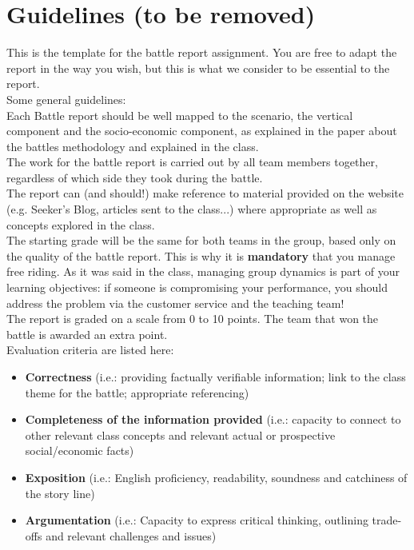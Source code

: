 \section{Guidelines (to be removed)}
This is the template for the battle report assignment. You are free to adapt the report in the way you wish, but this is what we consider to be essential to the report.\\
\vspace{1em}
Some general guidelines: \\
Each Battle report should be well mapped to the scenario, the vertical component  and the socio-economic component, as explained in the paper about the battles methodology and explained in the class.\\
The work for the battle report is carried out by all team members together, regardless of which side they took during the battle.\\
The report can (and should!) make reference to material provided on the website (e.g. Seeker’s Blog, articles sent to the class...) where appropriate as well as concepts explored in the class.\\
The starting grade will be the same for both teams in the group, based only on the quality of the battle report. This is why it is \textbf{mandatory} that you manage free riding. As it was said in the class, managing group dynamics is part of your learning objectives: if someone is compromising your performance, you should address the problem via the customer service and the teaching team!\\
The report is graded on a scale from 0 to 10 points. The team that won the battle is awarded an extra point.\\
Evaluation criteria are listed here:
\begin{itemize}
\item \textbf{Correctness} (i.e.: providing factually verifiable information; link to the class theme for the battle; appropriate referencing)
\item \textbf{Completeness of the information provided} (i.e.: capacity to connect to other relevant class concepts and relevant actual or prospective social/economic facts)
\item \textbf{Exposition} (i.e.: English proficiency, readability, soundness and catchiness of the story line)
\item \textbf{Argumentation} (i.e.: Capacity to express critical thinking, outlining trade-offs and relevant challenges and issues)
\end{itemize}
